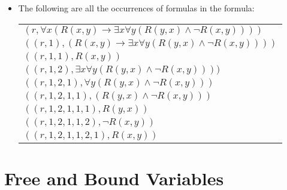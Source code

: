 \begin{enumerate}[\thesection.1]
\begin{itemize}
				\item The following are all the occurrences of formulas in the formula:
				\begin{longtable}{l}		
					$(r,\forall x(R(x,y)\to \exists x\forall y(R(y,x)\land \neg R(x,y))))$\\
					$((r,1),(R(x,y)\to \exists x\forall y(R(y,x)\land \neg R(x,y))))$\\
					$((r,1,1),R(x,y))$\\
					$((r,1,2),\exists x\forall y(R(y,x)\land \neg R(x,y))))$\\
					$((r,1,2,1),\forall y(R(y,x)\land \neg R(x,y)))$\\
					$((r,1,2,1,1),(R(y,x)\land \neg R(x,y)))$\\
					$((r,1,2,1,1,1),R(y,x))$\\
					$((r,1,2,1,1,2),\neg R(x,y))$\\
					$((r,1,2,1,1,2,1),R(x,y))$\\
					
				\end{longtable}
				
				
			\end{itemize}

\end{enumerate}

\section{Free and Bound Variables}

